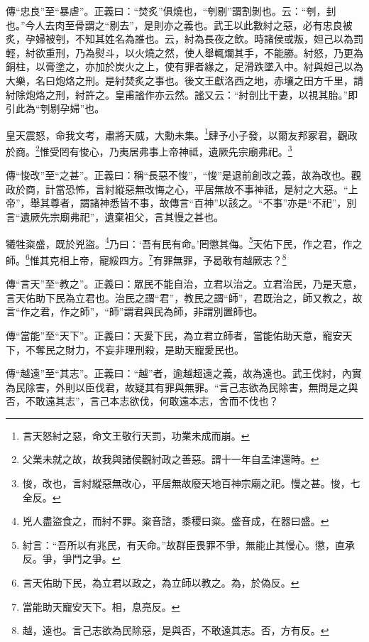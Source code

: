 {\noindent\zhuan{}\fzbyks 傳“忠良”至“暴虐”。正義曰：“焚炙”俱燒也，“刳剔”謂割剝也。云：“刳，刲也。”今人去肉至骨謂之“剔去”，是則亦之義也。武王以此數紂之惡，必有忠良被炙，孕婦被刳，不知其姓名為誰也。云，紂為長夜之飲。時諸侯或叛，妲己以為罰輕，紂欲重刑，乃為熨斗，以火燒之然，使人舉輒爛其手，不能勝。紂怒，乃更為銅柱，以膏塗之，亦加於炭火之上，使有罪者緣之，足滑跌墜入中。紂與妲己以為大樂，名曰炮烙之刑。是紂焚炙之事也。後文王獻洛西之地，赤壤之田方千里，請紂除炮烙之刑，紂許之。皇甫謐作亦云然。謐又云：“紂剖比干妻，以視其胎。”即引此為“刳剔孕婦”也。 \par}

皇天震怒，命我文考，肅將天威，大勳未集。\footnote{言天怒紂之惡，命文王敬行天罰，功業未成而崩。}肆予小子發，以爾友邦冢君，觀政於商。\footnote{父業未就之故，故我與諸侯觀紂政之善惡。謂十一年自孟津還時。}惟受罔有悛心，乃夷居弗事上帝神祗，遺厥先宗廟弗祀。\footnote{悛，改也，言紂縱惡無改心，平居無故廢天地百神宗廟之祀。慢之甚。悛，七全反。}

{\noindent\zhuan{}\fzbyks 傳“悛改”至“之甚”。正義曰：稱“長惡不悛”，“悛”是退前創改之義，故為改也。觀政於商，計當恐怖，言紂縱惡無改悔之心，平居無故不事神祗，是紂之大惡。“上帝”，舉其尊者，謂諸神悉皆不事，故傳言“百神”以該之。“不事”亦是“不祀”，別言“遺厥先宗廟弗祀”，遺棄祖父，言其慢之甚也。 \par}

犧牲粢盛，既於兇盜。\footnote{兇人盡盜食之，而紂不罪。粢音諮，黍稷曰粢。盛音成，在器曰盛。}乃曰：‘吾有民有命。’罔懲其侮。\footnote{紂言：“吾所以有兆民，有天命。”故群臣畏罪不爭，無能止其慢心。懲，直承反。爭，爭鬥之爭。}天佑下民，作之君，作之師。\footnote{言天佑助下民，為立君以政之，為立師以教之。為，於偽反。}惟其克相上帝，寵綏四方。\footnote{當能助天寵安天下。相，息亮反。}有罪無罪，予曷敢有越厥志？\footnote{越，遠也。言己志欲為民除惡，是與否，不敢遠其志。否，方有反。}

{\noindent\zhuan{}\fzbyks 傳“言天”至“教之”。正義曰：眾民不能自治，立君以治之。立君治民，乃是天意，言天佑助下民為立君也。治民之謂“君”，教民之謂“師”，君既治之，師又教之，故言“作之君，作之師”，“師”謂君與民為師，非謂別置師也。 \par}

{\noindent\zhuan{}\fzbyks 傳“當能”至“天下”。正義曰：天愛下民，為立君立師者，當能佑助天意，寵安天下，不奪民之財力，不妄非理刑殺，是助天寵愛民也。 \par}

{\noindent\zhuan{}\fzbyks 傳“越遠”至“其志”。正義曰：“越”者，逾越超遠之義，故為遠也。武王伐紂，內實為民除害，外則以臣伐君，故疑其有罪與無罪。“言己志欲為民除害，無問是之與否，不敢遠其志”，言己本志欲伐，何敢遠本志，舍而不伐也？ \par}

